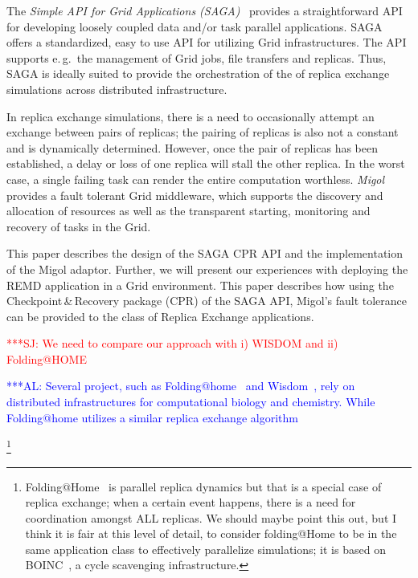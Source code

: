 \documentclass[times, 10pt,twocolumn]{article}
\newcommand{\kimnote}[1]{ {\textcolor{green} { ***JK: #1 }}}
\newcommand{\alnote}[1]{ {\textcolor{blue} { ***AL: #1 }}}
\newcommand{\jhanote}[1]{ {\textcolor{red} { ***SJ: #1 }}}
\newcommand{\kimnote}[1]{}
\newcommand{\alnote}[1]{}
\newcommand{\jhanote}[1]{}
\begin{document}
The \emph{Simple API for Grid Applications (SAGA)}~\cite{saga_gfd90}
provides a straightforward API for developing loosely coupled data
and/or task parallel applications.
SAGA offers a standardized, easy to use API for utilizing Grid
infrastructures. The API supports e.\,g.\ the management of Grid jobs,
file transfers and replicas. Thus, SAGA is ideally suited to provide
the orchestration of the of replica exchange simulations across
distributed infrastructure.
                                                         
In replica exchange simulations, there is a need to occasionally
attempt an exchange between pairs of replicas; the pairing of replicas
is also not a constant and is dynamically determined. However, once
the pair of replicas has been established, a delay or loss of one
replica will stall the other replica. In the worst case, a single
failing task can render the entire computation worthless.
\emph{Migol}~\cite{schnorLuckow08} provides a fault tolerant Grid
middleware, which supports the discovery and allocation of resources
as well as the transparent starting, monitoring and recovery of tasks
in the Grid.

This paper describes the design of the SAGA CPR API and the
implementation of the Migol adaptor. Further, we will present our
experiences with deploying the REMD application in a Grid environment.
This paper describes how using the Checkpoint\,\&\,Recovery package
(CPR) of the SAGA API, Migol's fault tolerance can be provided to the
class of Replica Exchange applications.

\jhanote{We need to compare our approach with i) WISDOM and ii)
  Folding@HOME}             

\alnote{Several project, such as Folding@home~\cite{folding} and
  Wisdom~\cite{wisdom}, rely on distributed infrastructures for
  computational biology and chemistry. While Folding@home utilizes a
  similar replica exchange algorithm~\cite{PhysRevLett.86.4983}}


\footnote{Folding@Home~\cite{PhysRevLett.86.4983} is parallel replica
  dynamics but that is a special case of replica exchange; when a
  certain event happens, there is a need for coordination amongst ALL
  replicas. We should maybe point this out, but I think it is fair at
  this level of detail, to consider folding@Home to be in the same
  application class to effectively parallelize simulations; it is
  based on BOINC~\cite{1033223}, a cycle scavenging infrastructure.}
\end{document}
